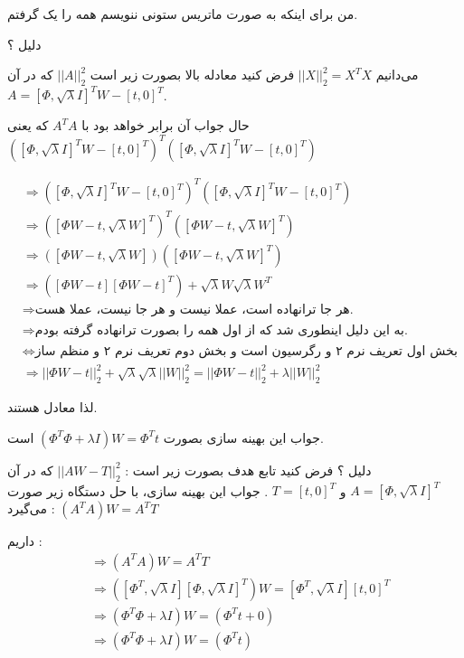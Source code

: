 \documentclass[a4paper, 12pt]{article}
\begin{document}
من برای اینکه به صورت ماتریس ستونی ننویسم همه را یک 
گرفتم.


 دلیل ؟‌
 
 می‌دانیم 
 $||X||^2_2 = X^TX$
 فرض کنید معادله بالا بصورت زیر است 
 $||A||_2^2$
 که در آن 
 $A = [\Phi, \sqrt{\lambda}I]^T W - [t, 0]^T$.
 
 
 حال جواب آن برابر خواهد بود با 
 $A^TA$
 که یعنی 
 $\left( [\Phi, \sqrt{\lambda}I]^T W - [t, 0]^T\right)^T\left( [\Phi, \sqrt{\lambda}I]^T W - [t, 0]^T\right)$
 
 \begin{align*}
 	&\Longrightarrow \left( [\Phi, \sqrt{\lambda}I]^T W - [t, 0]^T\right)^T\left( [\Phi, \sqrt{\lambda}I]^T W - [t, 0]^T\right)\\
 	&\Longrightarrow \left( [\Phi W - t , \sqrt{\lambda}W]^T\right)^T \left([\Phi W - t , \sqrt{\lambda}W]^T\right)\\
 	&\Longrightarrow \left([\Phi W - t , \sqrt{\lambda}W]\right)\left([\Phi W - t , \sqrt{\lambda}W]^T\right)\\
 	&\Longrightarrow \left([\Phi W - t][\Phi W - t]^T\right) + \sqrt{\lambda}W \sqrt{\lambda}W^T\\
 	&\Longrightarrow \text{
 	هر جا ترانهاده است، عملا نیست و هر جا نیست، عملا هست. 
 }\\
&\Longrightarrow\text{
به این دلیل اینطوری شد که از اول همه را بصورت ترانهاده گرفته بودم.	
}\\
&\Longleftrightarrow \text{
بخش اول تعریف نرم ۲ و رگرسیون است و بخش دوم تعریف نرم ۲ و منظم ساز است
}\\
&\Longrightarrow ||\Phi W - t || _2^2 + \sqrt{\lambda}\sqrt{\lambda}||W||_2^2 = ||\Phi W - t || _2^2 + \lambda||W||_2^2
 \end{align*}

لذا معادل هستند.


جواب این بهینه سازی بصورت 
$(\Phi^T\Phi + \lambda I )W = \Phi^T t$
است.


دلیل ؟ 
فرض کنید تابع هدف بصورت زیر است : 
$||AW - T ||_2^2$
که در آن 
$A = [\Phi,\sqrt{\lambda}I]^T$
و
$T = [t, 0]^T$
. جواب این بهینه سازی، با حل دستگاه زیر صورت می‌گیرد :
$(A^TA)W = A^TT$

داریم :
\begin{align*}
	&\Longrightarrow (A^TA)W = A^TT \\
	&\Longrightarrow \left([\Phi^T,\sqrt{\lambda}I] [\Phi,\sqrt{\lambda}I]^T\right) W = [\Phi^T,\sqrt{\lambda}I][t, 0]^T\\
	&\Longrightarrow \left(\Phi^T \Phi  + \lambda I\right)W = \left(\Phi^T t + 0\right)\\
	&\Longrightarrow \left(\Phi^T \Phi  + \lambda I\right)W =  \left(\Phi^T t\right)
\end{align*}
\end{document}
